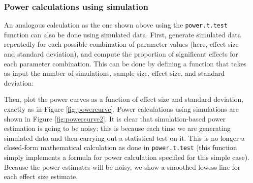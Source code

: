 \documentclass[
  12pt,
]{krantz}
\newenvironment{Shaded}{\begin{snugshade}}{\end{snugshade}}
\newcommand{\AttributeTok}[1]{\textcolor[rgb]{0.77,0.63,0.00}{#1}}
\newcommand{\ConstantTok}[1]{\textcolor[rgb]{0.00,0.00,0.00}{#1}}
\newcommand{\ControlFlowTok}[1]{\textcolor[rgb]{0.13,0.29,0.53}{\textbf{#1}}}
\newcommand{\DecValTok}[1]{\textcolor[rgb]{0.00,0.00,0.81}{#1}}
\newcommand{\DocumentationTok}[1]{\textcolor[rgb]{0.56,0.35,0.01}{\textbf{\textit{#1}}}}
\newcommand{\FloatTok}[1]{\textcolor[rgb]{0.00,0.00,0.81}{#1}}
\newcommand{\FunctionTok}[1]{\textcolor[rgb]{0.00,0.00,0.00}{#1}}
\newcommand{\NormalTok}[1]{#1}
\newcommand{\OtherTok}[1]{\textcolor[rgb]{0.56,0.35,0.01}{#1}}
\newcommand{\SpecialCharTok}[1]{\textcolor[rgb]{0.00,0.00,0.00}{#1}}
\theoremstyle{definition}
\theoremstyle{definition}
\theoremstyle{definition}
\theoremstyle{definition}
\theoremstyle{remark}
\begin{document}
\hypertarget{power-calculations-using-simulation}{%
\subsubsection{Power calculations using simulation}\label{power-calculations-using-simulation}}

An analogous calculation as the one shown above using the \texttt{power.t.test} function can also be done using simulated data.
First, generate simulated data repeatedly for each possible combination of parameter values (here, effect size and standard deviation), and compute the proportion of significant effects for each parameter combination. This can be done by defining a function that takes as input the number of simulations, sample size, effect size, and standard deviation:

\begin{Shaded}
\end{Shaded}

Then, plot the power curves as a function of effect size and standard deviation, exactly as in Figure \ref{fig:powercurve}. Power calculations using simulations are shown in Figure \ref{fig:powercurve2}. It is clear that simulation-based power estimation is going to be noisy; this is because each time we are generating simulated data and then carrying out a statistical test on it. This is no longer a closed-form mathematical calculation as done in \texttt{power.t.test} (this function simply implements a formula for power calculation specified for this simple case). Because the power estimates will be noisy, we show a smoothed lowess line for each effect size estimate.
\end{document}
